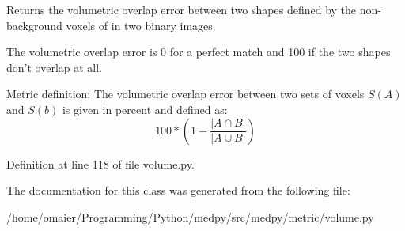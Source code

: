 Returns the volumetric overlap error between two shapes defined by the non-\/background voxels of in two binary images. 

The volumetric overlap error is 0 for a perfect match and 100 if the two shapes don't overlap at all.

Metric definition: The volumetric overlap error between two sets of voxels $S(A)$ and $S(b)$ is given in percent and defined as: \[ 100 * \left( 1 - \frac{|A\cap B|}{|A\cup B|} \right) \] 

Definition at line 118 of file volume.py.



The documentation for this class was generated from the following file:\begin{DoxyCompactItemize}
\item 
/home/omaier/Programming/Python/medpy/src/medpy/metric/volume.py\end{DoxyCompactItemize}
